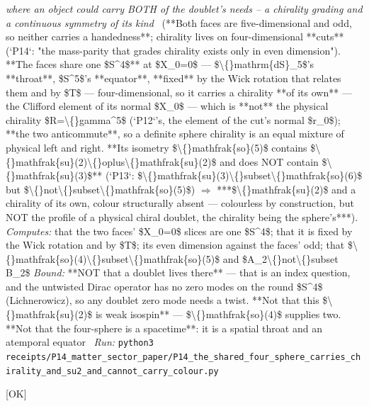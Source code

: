 \begin{description}
\textit{where an object could carry BOTH of the doublet's needs -- a chirality grading and a continuous symmetry of its kind} \ (**Both faces are five-dimensional and odd, so neither carries a handedness**; chirality lives on four-dimensional **cuts** (`P14`: "the mass-parity that grades chirality exists only in even dimension").  **The faces share one \$S\textasciicircum{}4\$** at \$X\_0=0\$ --- \$\textbackslash\{\}mathrm\{dS\}\_5\$'s **throat**, \$S\textasciicircum{}5\$'s **equator**, **fixed** by the Wick rotation that relates them and by \$T\$ --- four-dimensional, so it carries a chirality **of its own** --- the Clifford element of its normal \$X\_0\$ --- which is **not** the physical chirality \$R=\textbackslash\{\}gamma\textasciicircum{}5\$ (`P12`'s, the element of the cut's normal \$r\_0\$); **the two anticommute**, so a definite sphere chirality is an equal mixture of physical left and right.  **Its isometry \$\textbackslash\{\}mathfrak\{so\}(5)\$ contains \$\textbackslash\{\}mathfrak\{su\}(2)\textbackslash\{\}oplus\textbackslash\{\}mathfrak\{su\}(2)\$ and does NOT contain \$\textbackslash\{\}mathfrak\{su\}(3)\$** (`P13`: \$\textbackslash\{\}mathfrak\{su\}(3)\textbackslash\{\}subset\textbackslash\{\}mathfrak\{so\}(6)\$ but \$\textbackslash\{\}not\textbackslash\{\}subset\textbackslash\{\}mathfrak\{so\}(5)\$) \ensuremath{\Rightarrow} ***\$\textbackslash\{\}mathfrak\{su\}(2)\$ and a chirality of its own, colour structurally absent --- colourless by construction, but NOT the profile of a physical chiral doublet, the chirality being the sphere's***). 
\emph{Computes:} that the two faces' \$X\_0=0\$ slices are one \$S\textasciicircum{}4\$; that it is fixed by the Wick rotation and by \$T\$; its even dimension against the faces' odd; that \$\textbackslash\{\}mathfrak\{so\}(4)\textbackslash\{\}subset\textbackslash\{\}mathfrak\{so\}(5)\$ and \$A\_2\textbackslash\{\}not\textbackslash\{\}subset B\_2\$
 \emph{Bound:}  **NOT that a doublet lives there** --- that is an index question, and the untwisted Dirac operator has no zero modes on the round \$S\textasciicircum{}4\$ (Lichnerowicz), so any doublet zero mode needs a twist. **Not that this \$\textbackslash\{\}mathfrak\{su\}(2)\$ is weak isospin** --- \$\textbackslash\{\}mathfrak\{so\}(4)\$ supplies two. **Not that the four-sphere is a spacetime**: it is a spatial throat and an atemporal equator
\ \emph{Run:} \texttt{python3 receipts/P14\_matter\_sector\_paper/P14\_the\_shared\_four\_sphere\_carries\_chirality\_and\_su2\_and\_cannot\_carry\_colour.py}
\item[\rcptlabel{P14_the_core_family_carries_no_first_cohomology_and_the_cover_is_a_sphere}{P14R85}\textbf{P14R85}\quad\texttt{P14\_the\_core\_family\_carries\_no\_first\_cohomology\_and\_the\_cover\_is\_a\_sphere}]\hfill\textsf{[OK]}\\

\end{description}
